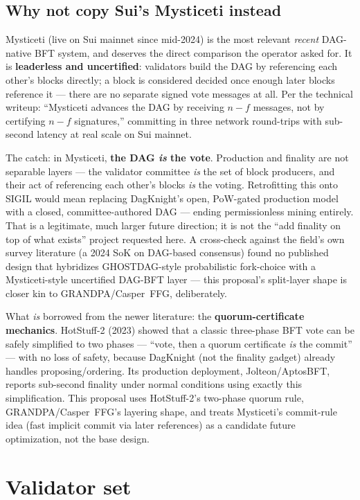 \documentclass[10pt,a4paper]{article}
\begin{document}
\subsection{Why not copy Sui's Mysticeti instead}

Mysticeti (live on Sui mainnet since mid-2024) is the most relevant \emph{recent} DAG-native BFT system,
and deserves the direct comparison the operator asked for. It is \textbf{leaderless and uncertified}:
validators build the DAG by referencing each other's blocks directly; a block is considered decided once
enough later blocks reference it — there are no separate signed vote messages at all. Per the technical
writeup: ``Mysticeti advances the DAG by receiving $n-f$ messages, not by certifying $n-f$ signatures,''
committing in three network round-trips with sub-second latency at real scale on Sui mainnet.

The catch: in Mysticeti, \textbf{the DAG \emph{is} the vote}. Production and finality are not
separable layers — the validator committee \emph{is} the set of block producers, and their act of
referencing each other's blocks \emph{is} the voting. Retrofitting this onto SIGIL would mean replacing
DagKnight's open, PoW-gated production model with a closed, committee-authored DAG — ending permissionless
mining entirely. That is a legitimate, much larger future direction; it is not the ``add finality on top
of what exists'' project requested here. A cross-check against the field's own survey literature (a
2024 SoK on DAG-based consensus) found no published design that hybridizes GHOSTDAG-style probabilistic
fork-choice with a Mysticeti-style uncertified DAG-BFT layer — this proposal's split-layer shape is
closer kin to GRANDPA/Casper~FFG, deliberately.

What \emph{is} borrowed from the newer literature: the \textbf{quorum-certificate mechanics}. HotStuff-2
(2023) showed that a classic three-phase BFT vote can be safely simplified to two phases — ``vote,
then a quorum certificate \emph{is} the commit'' — with no loss of safety, because DagKnight (not the
finality gadget) already handles proposing/ordering. Its production deployment, Jolteon/AptosBFT,
reports sub-second finality under normal conditions using exactly this simplification. This proposal
uses HotStuff-2's two-phase quorum rule, GRANDPA/Casper~FFG's layering shape, and treats Mysticeti's
commit-rule idea (fast implicit commit via later references) as a candidate future optimization, not
the base design.

\section{Validator set}
\end{document}
